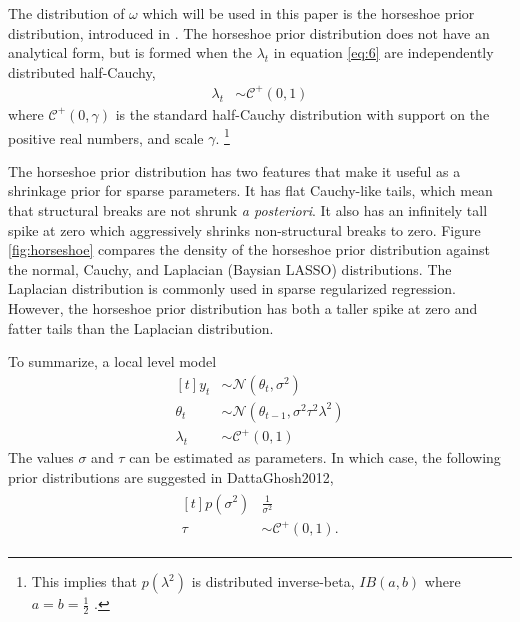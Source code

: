 \documentclass{article}
\newcommand{\paren}[1]{\ensuremath{\left(#1\right)}}
\newcommand{\dnorm}[1]{\ensuremath{\mathcal{N}\paren{#1}}}
\newcommand{\dhalfcauchy}[1]{\ensuremath{\mathcal{C}^{+}\paren{#1}}}
\begin{document}
The distribution of $\omega$ which will be used in this paper is the horseshoe prior distribution, introduced in \textcites{CarvalhoPolsonScott2009}{CarvalhoPolsonScott2010}.
The horseshoe prior distribution does not have an analytical form, but is formed when the $\lambda_{t}$ in equation \eqref{eq:6} are independently distributed half-Cauchy,
\begin{align}
  \label{eq:13}
  \lambda_{t} &\sim \dhalfcauchy{0, 1}
\end{align}
where $\dhalfcauchy{0, \gamma}$ is the standard half-Cauchy distribution with support on the positive real numbers, and scale $\gamma$.%
\footnote{
  This implies that $p(\lambda^{2})$ is distributed inverse-beta, $IB(a, b)$ where $a = b = \frac{1}{2}$ \parencite[4]{PolsonScott2010}. 
}

The horseshoe prior distribution has two features that make it useful as a shrinkage prior for sparse parameters.
It has flat Cauchy-like tails, which mean that structural breaks are not shrunk \textit{a posteriori}.
It also has an infinitely tall spike at zero which aggressively shrinks non-structural breaks to zero.
Figure \ref{fig:horseshoe} compares the density of the horseshoe prior distribution against the normal, Cauchy, and Laplacian (Baysian LASSO) distributions.
The Laplacian distribution is commonly used in sparse regularized regression.
However, the horseshoe prior distribution has both a taller spike at zero and fatter tails than the Laplacian distribution.


To summarize, a local level model 
\begin{equation}
  \label{eq:3}
  \begin{aligned}[t]
    y_{t} & \sim \dnorm{\theta_{t}, \sigma^{2}} \\
    \theta_{t} & \sim \dnorm{\theta_{t - 1}, \sigma^{2} \tau^{2} \lambda^{2}} \\
    \lambda_{t} & \sim \dhalfcauchy{0, 1}
  \end{aligned}
\end{equation}
The values $\sigma$ and $\tau$ can be estimated as parameters. 
In which case, the following prior distributions are suggested in \textcite{CarvalhoPolsonScott2010}{DattaGhosh2012},
\begin{align}
  \label{eq:9}
  \begin{aligned}[t]
    p(\sigma^{2}) & \frac{1}{\sigma^{2}}  \\
    \tau &\sim \dhalfcauchy{0, 1} \text{.}
  \end{aligned}
\end{align}
\end{document}
